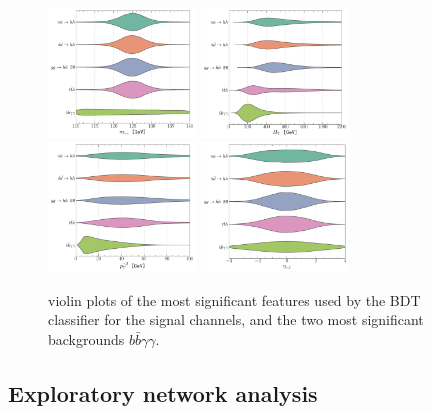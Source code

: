 \begin{figure}[htpb!]
	\centering
	\includegraphics[width=0.35\textwidth]{fig/shape-MAA} 	\hspace*{0.25 cm}
	\includegraphics[width=0.35\textwidth]{fig/shape-HT}  \\
	\includegraphics[width=0.35\textwidth]{fig/shape-PTA2} \hspace*{0.25 cm}
	\includegraphics[width=0.35\textwidth]{fig/shape-ETAa1} 
	\caption{violin plots of the most significant features used by the BDT classifier for the signal channels, and the two most significant backgrounds $ b \bar b \gamma \gamma$. }
	\label{fig:voilen}
\end{figure}  
\subsection{ Exploratory network analysis}

